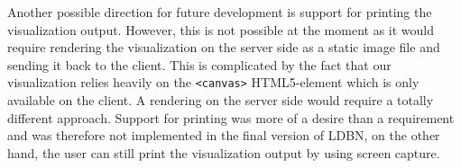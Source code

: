 Another possible direction for future development is support for printing the visualization output.
However, this is not possible at the moment as it would require rendering the visualization on the server side as
a static image file and sending it back to the client. 
This is complicated by the fact that our visualization relies heavily on
the \verb=<canvas>= HTML5-element which is only available on the client. 
A rendering on the server side would require a totally different approach. 
Support for printing was more of a desire than a requirement and was therefore not implemented 
in the final version of LDBN, on the other hand, the user can still print the visualization output
by using screen capture.

